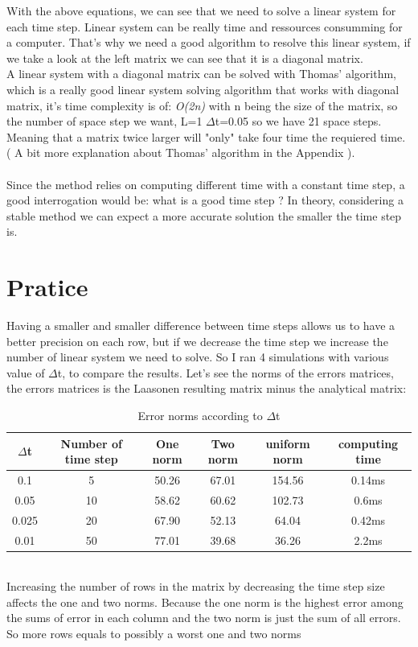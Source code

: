 \documentclass[12pt, a4paper]{report}
\begin{document}
With the above equations, we can see that we need to solve a linear system for each time step. Linear system can be really time and ressources consumming for a computer. That's why we need a good algorithm to resolve this linear system, if we take a look at the left matrix we can see that it is a diagonal matrix.\\
A linear system with a diagonal matrix can be solved with Thomas' algorithm, which is a really good linear system solving algorithm that works with diagonal matrix, it's time complexity is of:  \textit{O(2n)} with n being the size of the matrix, so the number of space step we want, L=1 $\Delta$t=0.05 so we have 21 space steps. Meaning that a matrix twice larger will "only" take four time the requiered time. ( A bit more explanation about Thomas' algorithm in the Appendix ).
\paragraph{}
Since the method relies on computing different time with a constant time step, a good interrogation would be: what is a good time step ? In theory, considering a stable method we can expect a more accurate solution the smaller the time step is.

\section{Pratice} 
Having a smaller and smaller difference between time steps allows us to have a better precision on each row, but if we decrease the time step we increase the number of linear system we need to solve. So I ran 4 simulations with various value of $\Delta$t, to compare the results. Let's see the norms of the errors matrices, the errors matrices is the Laasonen resulting matrix minus the analytical matrix:
\begin{table}[ht]
\centering
\begin{tabular}{c c c c c c}
\toprule
$\Delta$t&Number of time step&One norm&Two norm&uniform norm&computing time\\
\midrule
0.1 &5&50.26&67.01&154.56&0.14ms\\
0.05 &10&58.62&60.62&102.73&0.6ms\\
0.025 &20&67.90&52.13&64.04&0.42ms\\
0.01 &50&77.01&39.68&36.26&2.2ms\\
\end{tabular}
\caption{Error norms according to $\Delta$t}
\end{table} \\
Increasing the number of rows in the matrix by decreasing the time step size affects the one and two norms. Because the one norm is the highest error among the sums of error in each column and the two norm is just the sum of all errors. So more rows equals to possibly a worst one and two norms\\
\end{document}
